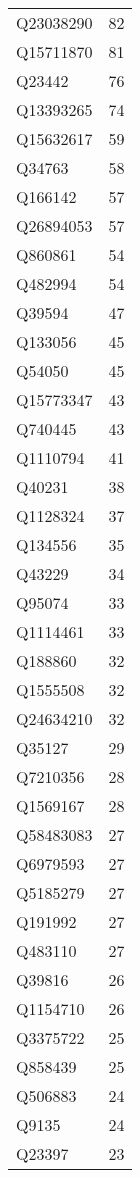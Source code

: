 \begin{tabular}{lr}
   Q23038290 &     82 \\
   Q15711870 &     81 \\
      Q23442 &     76 \\
   Q13393265 &     74 \\
   Q15632617 &     59 \\
      Q34763 &     58 \\
     Q166142 &     57 \\
   Q26894053 &     57 \\
     Q860861 &     54 \\
     Q482994 &     54 \\
      Q39594 &     47 \\
     Q133056 &     45 \\
      Q54050 &     45 \\
   Q15773347 &     43 \\
     Q740445 &     43 \\
    Q1110794 &     41 \\
      Q40231 &     38 \\
    Q1128324 &     37 \\
     Q134556 &     35 \\
      Q43229 &     34 \\
      Q95074 &     33 \\
    Q1114461 &     33 \\
     Q188860 &     32 \\
    Q1555508 &     32 \\
   Q24634210 &     32 \\
      Q35127 &     29 \\
    Q7210356 &     28 \\
    Q1569167 &     28 \\
   Q58483083 &     27 \\
    Q6979593 &     27 \\
    Q5185279 &     27 \\
     Q191992 &     27 \\
     Q483110 &     27 \\
      Q39816 &     26 \\
    Q1154710 &     26 \\
    Q3375722 &     25 \\
     Q858439 &     25 \\
     Q506883 &     24 \\
       Q9135 &     24 \\
      Q23397 &     23 \\

\end{tabular}
